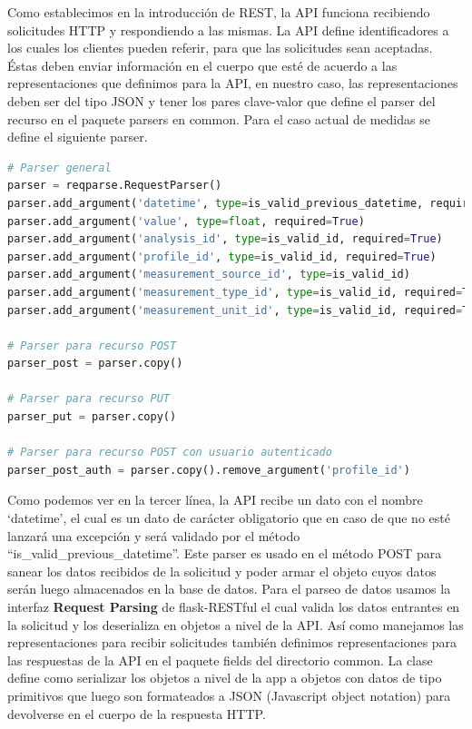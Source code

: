 \documentclass[a4paper,12pt]{article}
\begin{document}
\begin{itemize}
Como establecimos en la introducción de REST, la API funciona recibiendo solicitudes HTTP y respondiendo a las mismas. La API define identificadores a los cuales los clientes pueden referir, para que las solicitudes sean aceptadas. Éstas deben enviar información en el cuerpo que esté de acuerdo a las representaciones que definimos para la API, en nuestro caso, las representaciones deben ser del tipo JSON y tener los pares clave-valor que define el parser del recurso en el paquete parsers en common. Para el caso actual de medidas se define el siguiente parser.

\begin{lstlisting}[language=Python]
# Parser general
parser = reqparse.RequestParser()
parser.add_argument('datetime', type=is_valid_previous_datetime, required=True)
parser.add_argument('value', type=float, required=True)
parser.add_argument('analysis_id', type=is_valid_id, required=True)
parser.add_argument('profile_id', type=is_valid_id, required=True)
parser.add_argument('measurement_source_id', type=is_valid_id)
parser.add_argument('measurement_type_id', type=is_valid_id, required=True)
parser.add_argument('measurement_unit_id', type=is_valid_id, required=True)

# Parser para recurso POST
parser_post = parser.copy()

# Parser para recurso PUT
parser_put = parser.copy()

# Parser para recurso POST con usuario autenticado
parser_post_auth = parser.copy().remove_argument('profile_id')
\end{lstlisting}

Como podemos ver en la tercer línea, la API recibe un dato con el nombre ‘datetime’, el cual es un dato de carácter obligatorio que en caso de que no esté lanzará una excepción y será validado  por el método ``is\_valid\_previous\_datetime''. Este parser es usado en el método POST para sanear los datos recibidos de la solicitud y poder armar el objeto cuyos datos serán luego almacenados en la base de datos. Para el parseo de datos usamos la interfaz \textbf{Request Parsing} de flask-RESTful el cual valida los datos entrantes en la solicitud y los deserializa en objetos a nivel de la API.
Así como manejamos las representaciones para recibir solicitudes también definimos representaciones para las respuestas de la API en el paquete fields del directorio common. La clase define como serializar los objetos a nivel de la app a objetos con datos de tipo primitivos que luego son formateados a JSON (Javascript object notation) para devolverse en el cuerpo de la respuesta HTTP.


\end{itemize}
\end{document}
